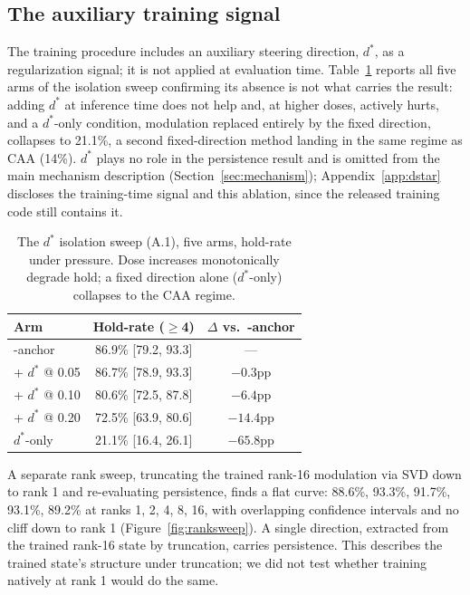 \subsection{The auxiliary training signal}
\label{sec:isolation-rank}

The training procedure includes an auxiliary steering direction, \(d^*\), as a
regularization signal; it is not applied at evaluation time. Table~\ref{tab:a1-dstar}
reports all five arms of the isolation sweep confirming its absence is not what carries
the result: adding \(d^*\) at inference time does not help and, at higher doses, actively hurts,
and a \(d^*\)-only condition, modulation replaced entirely by the fixed direction,
collapses to 21.1\%, a second fixed-direction method landing in the same regime as CAA
(14\%). \(d^*\) plays no role in the persistence result and is omitted from the main
mechanism description (Section~\ref{sec:mechanism}); Appendix~\ref{app:dstar} discloses
the training-time signal and this ablation, since the released training code still
contains it.

\begin{table}[t]
\centering
\caption{The \(d^*\) isolation sweep (A.1), five arms, hold-rate under pressure. Dose
increases monotonically degrade hold; a fixed direction alone (\(d^*\)-only) collapses
to the CAA regime.}
\label{tab:a1-dstar}
\begin{tabular}{lcc}
\toprule
Arm & Hold-rate (\(\ge\)4) & \(\Delta\) vs.\ \condF{}-anchor \\
\midrule
\condF{}-anchor & 86.9\% [79.2, 93.3] & --- \\
\condF{} + \(d^*\) @ 0.05 & 86.7\% [78.9, 93.3] & \(-0.3\)pp \\
\condF{} + \(d^*\) @ 0.10 & 80.6\% [72.5, 87.8] & \(-6.4\)pp \\
\condF{} + \(d^*\) @ 0.20 & 72.5\% [63.9, 80.6] & \(-14.4\)pp \\
\(d^*\)-only & 21.1\% [16.4, 26.1] & \(-65.8\)pp \\
\bottomrule
\end{tabular}
\end{table}

A separate rank sweep, truncating the trained rank-16 modulation via SVD down to rank 1
and re-evaluating persistence, finds a flat curve: 88.6\%, 93.3\%, 91.7\%, 93.1\%, 89.2\%
at ranks 1, 2, 4, 8, 16, with overlapping confidence intervals and no cliff down to rank
1 (Figure~\ref{fig:ranksweep}). A single direction, extracted from the trained rank-16
state by truncation, carries persistence. This describes the trained state's structure
under truncation; we did not test whether training natively at rank 1 would do the same.

